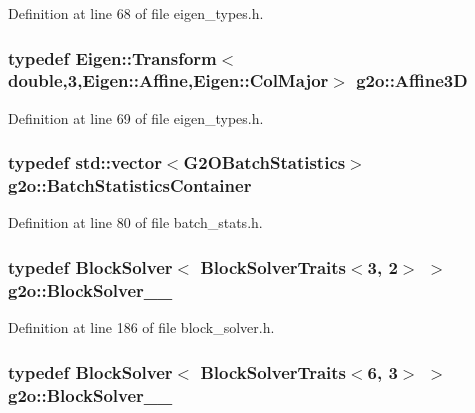 Definition at line 68 of file eigen\+\_\+types.\+h.

\subsubsection[{\texorpdfstring{Affine3D}{Affine3D}}]{\setlength{\rightskip}{0pt plus 5cm}typedef Eigen\+::\+Transform$<$double,3,Eigen\+::\+Affine,Eigen\+::\+Col\+Major$>$ {\bf g2o\+::\+Affine3D}}\hypertarget{namespaceg2o_ab3cae84956b78f00b9091c56c42af5eb}{}\label{namespaceg2o_ab3cae84956b78f00b9091c56c42af5eb}


Definition at line 69 of file eigen\+\_\+types.\+h.

\subsubsection[{\texorpdfstring{Batch\+Statistics\+Container}{BatchStatisticsContainer}}]{\setlength{\rightskip}{0pt plus 5cm}typedef std\+::vector$<${\bf G2\+O\+Batch\+Statistics}$>$ {\bf g2o\+::\+Batch\+Statistics\+Container}}\hypertarget{namespaceg2o_a526b32fde21f83173acb2bb29db68275}{}\label{namespaceg2o_a526b32fde21f83173acb2bb29db68275}


Definition at line 80 of file batch\+\_\+stats.\+h.

\subsubsection[{\texorpdfstring{Block\+Solver\+\_\+3\+\_\+2}{BlockSolver_3_2}}]{\setlength{\rightskip}{0pt plus 5cm}typedef {\bf Block\+Solver}$<$ {\bf Block\+Solver\+Traits}$<$3, 2$>$ $>$ {\bf g2o\+::\+Block\+Solver\+\_\+\_}}\hypertarget{namespaceg2o_a4e97101bb6ac73bdb6527994a36b9819}{}\label{namespaceg2o_a4e97101bb6ac73bdb6527994a36b9819}


Definition at line 186 of file block\+\_\+solver.\+h.

\subsubsection[{\texorpdfstring{Block\+Solver\+\_\+6\+\_\+3}{BlockSolver_6_3}}]{\setlength{\rightskip}{0pt plus 5cm}typedef {\bf Block\+Solver}$<$ {\bf Block\+Solver\+Traits}$<$6, 3$>$ $>$ {\bf g2o\+::\+Block\+Solver\+\_\+\_}}\hypertarget{namespaceg2o_a6eb2ab4064026e9c63c99b783b892cda}{}\label{namespaceg2o_a6eb2ab4064026e9c63c99b783b892cda}


